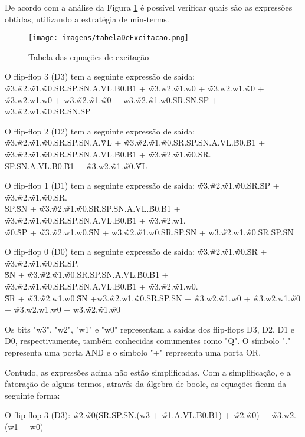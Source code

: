 De acordo com a análise da Figura \ref{fig:tabelaExcitacao} é possível verificar quais são as expressões obtidas, utilizando a estratégia de min-terms.

\begin{figure}[!h]
    \centering
    \texttt{[image: imagens/tabelaDeExcitacao.png]}
    \caption{Tabela das equações de excitação}
    \label{fig:tabelaExcitacao}
\end{figure}


O flip-flop 3 (D3) tem a seguinte expressão de saída: \~w3.\~w2.\~w1.\~w0.SR.SP.SN.A.VL.B0.B1 + \~w3.w2.\~w1.w0 + \~w3.w2.w1.\~w0 + \~w3.w2.w1.w0 + w3.\~w2.\~w1.\~w0 + w3.\~w2.\~w1.w0.SR.SN.SP + w3.\~w2.w1.\~w0.SR.SN.SP

O flip-flop 2 (D2) tem a seguinte expressão de saída: \~w3.\~w2.\~w1.\~w0.SR.SP.SN.A.\~VL + \~w3.\~w2.\~w1.\~w0.SR.SP.SN.A.VL.\~B0.\~B1 + \~w3.\~w2.\~w1.\~w0.SR.SP.SN.A.VL.\~B0.B1 + \~w3.\~w2.\~w1.\~w0.SR.\\SP.SN.A.VL.B0.\~B1 + \~w3.w2.\~w1.\~w0.\~VL

O flip-flop 1 (D1) tem a seguinte expressão de saída: \~w3.\~w2.\~w1.\~w0.SR.\~SP + \~w3.\~w2.\~w1.\~w0.SR.\\SP.\~SN + \~w3.\~w2.\~w1.\~w0.SR.SP.SN.A.VL.\~B0.B1 + \~w3.\~w2.\~w1.\~w0.SR.SP.SN.A.VL.B0.\~B1 + \~w3.\~w2.w1.\\ \~w0.\~SP + \~w3.\~w2.w1.w0.\~SN + w3.\~w2.\~w1.w0.SR.SP.SN + w3.\~w2.w1.\~w0.SR.SP.SN

O flip-flop 0 (D0) tem a seguinte expressão de saída: \~w3.\~w2.\~w1.\~w0.\~SR + \~w3.\~w2.\~w1.\~w0.SR.SP.\\ \~SN + \~w3.\~w2.\~w1.\~w0.SR.SP.SN.A.VL.\~B0.\~B1 + \~w3.\~w2.\~w1.\~w0.SR.SP.SN.A.VL.B0.\~B1 + \~w3.\~w2.\~w1.w0.\\ \~SR + \~w3.\~w2.w1.w0.\~SN +w3.\~w2.w1.\~w0.SR.SP.SN + \~w3.w2.\~w1.w0 + \~w3.w2.w1.\~w0 + \~w3.w2.w1.w0 + w3.\~w2.\~w1.\~w0

Os bits "w3", "w2", "w1" e "w0" representam a saídas dos flip-flops D3, D2, D1 e D0, respectivamente, também conhecidas comumentes como "Q". O símbolo "." representa uma porta AND e o símbolo "+" representa uma porta OR.

Contudo, as expressões acima não estão simplificadas. Com a simplificação, e a fatoração de alguns termos, através da álgebra de boole, as equações ficam da seguinte forma:

O flip-flop 3 (D3): \~w2.\~w0(SR.SP.SN.(w3 + \~w1.A.VL.B0.B1) + \~w2.\~w0) + \~w3.w2.(w1 + w0)

